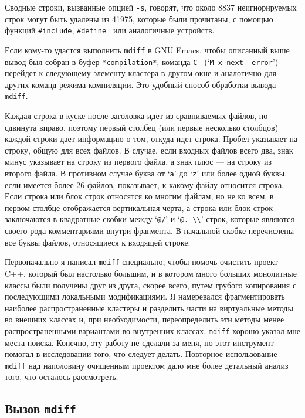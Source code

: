 Сводные строки, вызванные опцией \texttt{-s}, говорят, что около 8837
неигнорируемых строк могут быть удалены из 41975, которые были
прочитаны, с помощью функций \texttt{\#include}, \texttt{\#define\ } или
аналогичные устройств.

Если кому-то удастся выполнить \texttt{mdiff} в GNU Emacs, чтобы
описанный выше вывод был собран в буфер \texttt{*compilation*}, команда
\texttt{C-\textasciigrave{}} (`\texttt{M-x\ next-\ error}') перейдет к
следующему элементу кластера в другом окне и аналогично для других
команд режима компиляции. Это удобный способ обработки вывода
\texttt{mdiff}.

Каждая строка в куске после заголовка идет из сравниваемых файлов, но
сдвинута вправо, поэтому первый столбец (или первые несколько столбцов)
каждой строки дает информацию о том, откуда идет строка. Пробел
указывает на строку, общую для всех файлов. В случае, если входных
файлов всего два, знак минус указывает на строку из первого файла, а
знак плюс --- на строку из второго файла. В противном случае буква от
`\texttt{a}' до `\texttt{z}' или более одной буквы, если имеется более
26 файлов, показывает, к какому файлу относится строка. Если строка или
блок строк относятся ко многим файлам, но не ко всем, в первом столбце
отображается вертикальная черта, а строка или блок строк заключаются в
квадратные скобки между `\texttt{@/}' и
`\texttt{@.\ \textbackslash{}\textbackslash{}}' строк, которые являются
своего рода комментариями внутри фрагмента. В начальной скобке
перечислены все буквы файлов, относящиеся к входящей строке.

Первоначально я написал \texttt{mdiff} специально, чтобы помочь очистить
проект C++, который был настолько большим, и в котором много больших
монолитные классы были получены друг из друга, скорее всего, путем
грубого копирования с последующими локальными модификациями. Я
намеревался фрагментировать наиболее распространенные кластеры и
разделить части на виртуальные методы во внешних классах и, при
необходимости, переопределить эти методы менее распространенными
вариантами во внутренних классах. \texttt{mdiff} хорошо указал мне места
поиска. Конечно, эту работу не сделали за меня, но этот инструмент
помогал в исследовании того, что следует делать. Повторное использование
\texttt{mdiff} над наполовину очищенным проектом дало мне более
детальный анализ того, что осталось рассмотреть.

\hypertarget{_0412_044b_0437_043e_0432-mdiff}{%
\subsection{\texorpdfstring{Вызов
\texttt{mdiff}}{Вызов mdiff}}\label{_0412_044b_0437_043e_0432-mdiff}}

